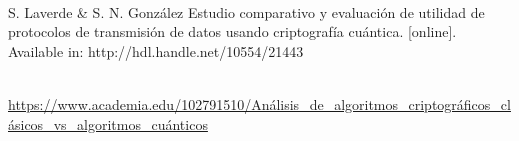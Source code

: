 \documentclass[12pt]{article}
\numberwithin{equation}{section} %
\begin{document}
    \newpage
    \thispagestyle{empty}
    \mbox{}
    
    \nocite{*} %

    \\

    S. Laverde & S. N. González Estudio comparativo y evaluación de utilidad de protocolos de transmisión de datos usando criptografía cuántica. [online]. Available in: http://hdl.handle.net/10554/21443

    \\

    \url{https://www.academia.edu/102791510/Análisis_de_algoritmos_criptográficos_clásicos_vs_algoritmos_cuánticos}
\end{document}
